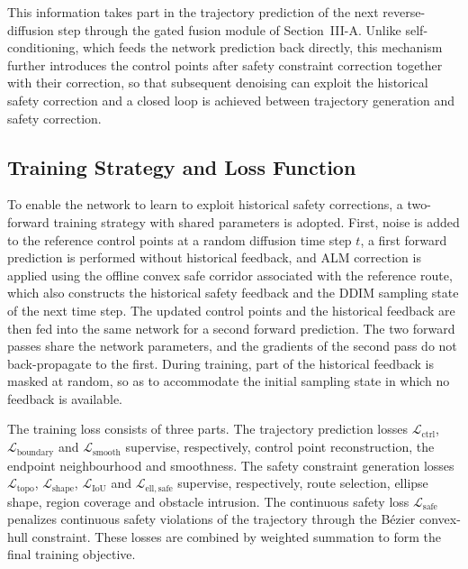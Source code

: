 \documentclass[journal]{IEEEtran}
\begin{document}
This information takes part in the trajectory prediction of the next
reverse-diffusion step through the gated fusion module of Section~III-A. Unlike
self-conditioning, which feeds the network prediction back directly, this
mechanism further introduces the control points after safety constraint
correction together with their correction, so that subsequent denoising can
exploit the historical safety correction and a closed loop is achieved between
trajectory generation and safety correction.

\subsection{Training Strategy and Loss Function}
To enable the network to learn to exploit historical safety corrections, a
two-forward training strategy with shared parameters is adopted. First, noise is
added to the reference control points at a random diffusion time step $t$, a
first forward prediction is performed without historical feedback, and ALM
correction is applied using the offline convex safe corridor associated with the
reference route, which also constructs the historical safety feedback and the
DDIM sampling state of the next time step. The updated control points and the
historical feedback are then fed into the same network for a second forward
prediction. The two forward passes share the network parameters, and the
gradients of the second pass do not back-propagate to the first. During
training, part of the historical feedback is masked at random, so as to
accommodate the initial sampling state in which no feedback is available.

The training loss consists of three parts. The trajectory prediction losses
$\mathcal L_{\mathrm{ctrl}}$, $\mathcal L_{\mathrm{boundary}}$ and
$\mathcal L_{\mathrm{smooth}}$ supervise, respectively, control point
reconstruction, the endpoint neighbourhood and smoothness. The safety
constraint generation losses $\mathcal L_{\mathrm{topo}}$,
$\mathcal L_{\mathrm{shape}}$, $\mathcal L_{\mathrm{IoU}}$ and
$\mathcal L_{\mathrm{ell,safe}}$ supervise, respectively, route selection,
ellipse shape, region coverage and obstacle intrusion. The continuous safety
loss $\mathcal L_{\mathrm{safe}}$ penalizes continuous safety violations of the
trajectory through the B\'ezier convex-hull constraint. These losses are
combined by weighted summation to form the final training objective.
\end{document}
